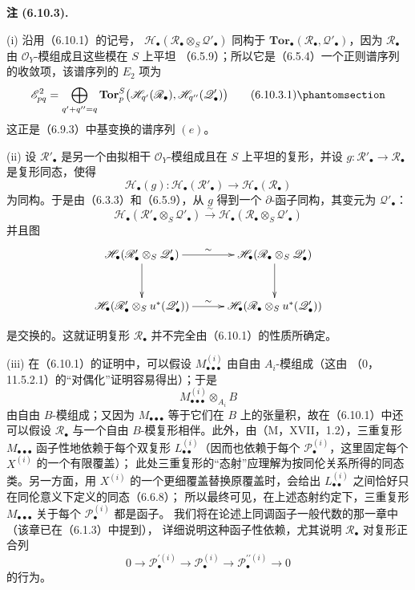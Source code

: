 \documentclass[UTF8,fontset=none,11pt,oneside,openany]{ctexbook}
\newenvironment{remarks}[1][]{%
  \par\medskip\noindent\textbf{注 (#1).}\ %
}{\par}
\newcommand{\oldpage}[2][]{%
  \hypertarget{ega-source-page-#1-#2}{}%
  \marginnote{\scriptsize\textbf{#1}~|~#2}\ignorespaces}
\let\EGAOriginalLabel\label
\renewcommand{\label}[1]{\phantomsection\EGAOriginalLabel{#1}}
\begin{document}
\begin{remarks}[6.10.3]
\textnormal{(i)} 沿用（6.10.1）的记号，
$\mathscr H_\bullet(\mathscr R_\bullet\otimes_S\mathscr Q'_\bullet)$ 同构于
$\mathbf{Tor}_\bullet(\mathscr R_\bullet,\mathscr Q'_\bullet)$，因为
$\mathscr R_\bullet$ 由 $\mathscr O_Y$-模组成且这些模在 $S$ 上平坦
（6.5.9）；所以它是（6.5.4）一个正则谱序列的收敛项，该谱序列的
$E_2$ 项为
\[
  \mathscr E_{pq}^2
  =
  \bigoplus_{q'+q''=q}
  \mathbf{Tor}_p^S
  \bigl(
    \mathscr H_{q'}(\mathscr R_\bullet),
    \mathscr H_{q''}(\mathscr Q'_\bullet)
  \bigr)
  \tag{6.10.3.1}\label{III.6.10.3.1.fr}
\]
这正是（6.9.3）中基变换的谱序列 $(e)$。

\medskip
\textnormal{(ii)} 设 $\mathscr R'_\bullet$ 是另一个由拟相干
$\mathscr O_Y$-模组成且在 $S$ 上平坦的复形，并设
$g:\mathscr R'_\bullet\to\mathscr R_\bullet$ 是复形同态，使得
\[
  \mathscr H_\bullet(g):
  \mathscr H_\bullet(\mathscr R'_\bullet)
  \longrightarrow
  \mathscr H_\bullet(\mathscr R_\bullet)
\]
为同构。于是由（6.3.3）和（6.5.9），从 $g$ 得到一个
$\partial$-函子同构，其变元为 $\mathscr Q'_\bullet$：
\[
  \mathscr H_\bullet
  (\mathscr R'_\bullet\otimes_S\mathscr Q'_\bullet)
  \xrightarrow{\sim}
  \mathscr H_\bullet
  (\mathscr R_\bullet\otimes_S\mathscr Q'_\bullet)
\]
并且图
\[
\xymatrix@C=28pt@R=30pt{
  \mathscr H_\bullet
  (\mathscr R'_\bullet\otimes_S\mathscr Q'_\bullet)
  \ar[r]^-{\sim}\ar[d]
  &
  \mathscr H_\bullet
  (\mathscr R_\bullet\otimes_S\mathscr Q'_\bullet)
  \ar[d]
  \\
  \mathscr H_\bullet
  (\mathscr R'_\bullet\otimes_Su^*(\mathscr Q'_\bullet))
  \ar[r]^-{\sim}
  &
  \mathscr H_\bullet
  (\mathscr R_\bullet\otimes_Su^*(\mathscr Q'_\bullet))
}
\]
\par\medskip\noindent
是交换的。这就证明复形 $\mathscr R_\bullet$ 并不完全由（6.10.1）的性质所确定。

\medskip
\oldpage[III]{173}
\textnormal{(iii)} 在（6.10.1）的证明中，可以假设
$M_{\bullet\bullet\bullet}^{(i)}$ 由自由 $A_i$-模组成（这由
（0，11.5.2.1）的“对偶化”证明容易得出）；于是
\[
  M_{\bullet\bullet\bullet}^{(i)}\otimes_{A_i}B
\]
由自由 $B$-模组成；又因为 $M_{\bullet\bullet\bullet}$ 等于它们在
$B$ 上的张量积，故在（6.10.1）中还可以假设 $\mathscr R_\bullet$
与一个自由 $B$-模复形相伴。此外，由（M，XVII，1.2），三重复形
$M_{\bullet\bullet\bullet}$ 函子性地依赖于每个双复形
$L_{\bullet\bullet}^{(i)}$（因而也依赖于每个
$\mathscr P_\bullet^{(i)}$，这里固定每个 $X^{(i)}$ 的一个有限覆盖）；
此处三重复形的“态射”应理解为按同伦关系所得的同态类。另一方面，用
$X^{(i)}$ 的一个更细覆盖替换原覆盖时，会给出
$L_{\bullet\bullet}^{(i)}$ 之间恰好只在同伦意义下定义的同态（6.6.8）；
所以最终可见，在上述态射约定下，三重复形
$M_{\bullet\bullet\bullet}$ 关于每个 $\mathscr P_\bullet^{(i)}$ 都是函子。
我们将在论述上同调函子一般代数的那一章中（该章已在（6.1.3）中提到），
详细说明这种函子性依赖，尤其说明 $\mathscr R_\bullet$ 对复形正合列
\[
  0\longrightarrow\mathscr P_\bullet^{\prime(i)}
  \longrightarrow\mathscr P_\bullet^{(i)}
  \longrightarrow\mathscr P_\bullet^{\prime\prime(i)}
  \longrightarrow0
\]
的行为。
\end{remarks}
\end{document}
